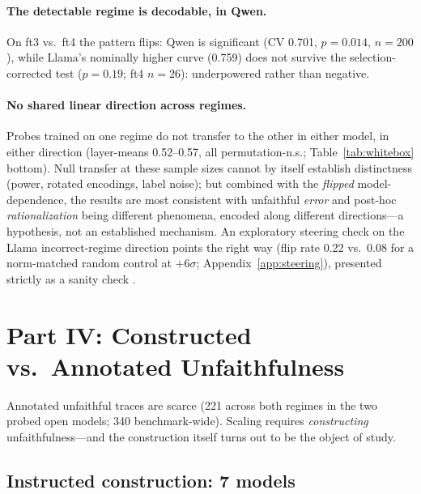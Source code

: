 \documentclass[11pt]{article}
\begin{document}
\paragraph{The detectable regime is decodable, in Qwen.} On ft3 vs.\ ft4 the pattern flips: Qwen is significant (CV 0.701, $p{=}0.014$, $n{=}200$), while Llama's nominally higher curve (0.759) does not survive the selection-corrected test ($p{=}0.19$; ft4 $n{=}26$): underpowered rather than negative.

\paragraph{No shared linear direction across regimes.} Probes trained on one regime do not transfer to the other in either model, in either direction (layer-means 0.52--0.57, all permutation-n.s.; Table~\ref{tab:whitebox} bottom). Null transfer at these sample sizes cannot by itself establish distinctness (power, rotated encodings, label noise); but combined with the \emph{flipped} model-dependence, the results are most consistent with unfaithful \emph{error} and post-hoc \emph{rationalization} being different phenomena, encoded along different directions---a hypothesis, not an established mechanism. An exploratory steering check on the Llama incorrect-regime direction points the right way (flip rate 0.22 vs.\ 0.08 for a norm-matched random control at $+6\sigma$; Appendix~\ref{app:steering}), presented strictly as a sanity check \citep[cf.][]{cox2026decoding,tan2024analysing}.

\section{Part IV: Constructed vs.\ Annotated Unfaithfulness}
\label{sec:construction}

Annotated unfaithful traces are scarce (221 across both regimes in the two probed open models; 340 benchmark-wide). Scaling requires \emph{constructing} unfaithfulness---and the construction itself turns out to be the object of study.

\subsection{Instructed construction: 7 models}
\label{sec:synth}
\end{document}

